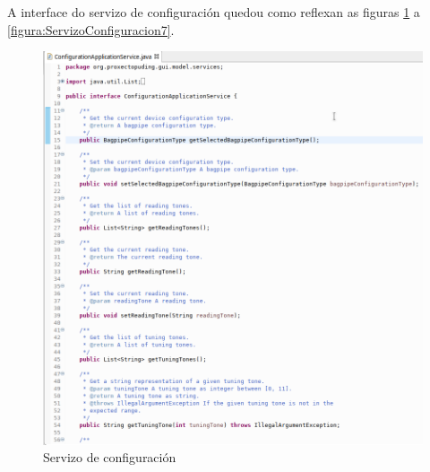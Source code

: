    A interface do servizo de configuración quedou como reflexan as figuras
   \ref{figura:ServizoConfiguracion1} a \ref{figura:ServizoConfiguracion7}. \\
   
   \begin{figure}[htbp]
    \centering
    \includegraphics[scale=0.6, keepaspectratio=true]{./imagenes/servizo-configuracion-1.png}
    \caption{Servizo de configuración}
    \label{figura:ServizoConfiguracion1}
   \end{figure}
   
